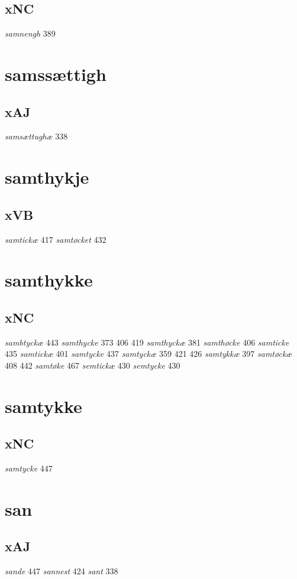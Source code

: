 \documentclass[a4paper,twocolumn]{article}
\begin{document}
\subsection{xNC}
\label{sec:org609c83e}
\emph{samnengh} 389 
\section{samssættigh}
\label{sec:org608a24b}
\subsection{xAJ}
\label{sec:org4d7bc22}
\emph{samsættughæ} 338 
\section{samthykje}
\label{sec:orgb9bfd6f}
\subsection{xVB}
\label{sec:org3c33dad}
\emph{samtickæ} 417 \emph{samtøcket} 432 
\section{samthykke}
\label{sec:orgdbf085b}
\subsection{xNC}
\label{sec:org30e42cb}
\emph{sambtyckæ} 443 \emph{samthycke} 373 406 419 \emph{samthyckæ} 381 \emph{samthøcke} 406 \emph{samticke} 435 \emph{samtickæ} 401 \emph{samtycke} 437 \emph{samtyckæ} 359 421 426 \emph{samtykkæ} 397 \emph{samtøckæ} 408 442 \emph{samtøke} 467 \emph{semtickæ} 430 \emph{semtycke} 430 
\section{samtykke}
\label{sec:org081c22a}
\subsection{xNC}
\label{sec:orgafe9bd2}
\emph{samtycke} 447 
\section{san}
\label{sec:org57baf0f}
\subsection{xAJ}
\label{sec:org7db8c05}
\emph{sande} 447 \emph{sannest} 424 \emph{sant} 338 
\end{document}
